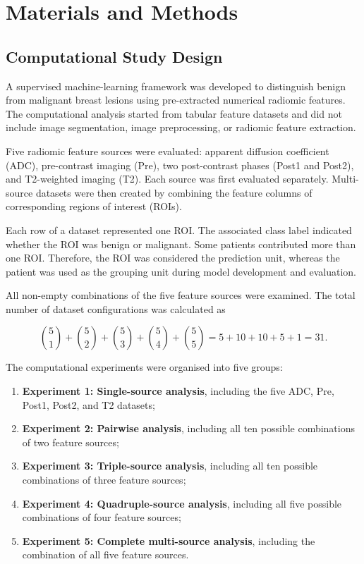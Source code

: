 \documentclass[12pt,twocolumn]{article}
\begin{document}
\section{Materials and Methods}
\label{sec:materials_methods}

\subsection{Computational Study Design}
\label{subsec:computational_design}

A supervised machine-learning framework was developed to distinguish
benign from malignant breast lesions using pre-extracted numerical
radiomic features. The computational analysis started from tabular
feature datasets and did not include image segmentation, image
preprocessing, or radiomic feature extraction.

Five radiomic feature sources were evaluated: apparent diffusion
coefficient (ADC), pre-contrast imaging (Pre), two post-contrast phases
(Post1 and Post2), and T2-weighted imaging (T2). Each source was first
evaluated separately. Multi-source datasets were then created by
combining the feature columns of corresponding regions of interest
(ROIs).

Each row of a dataset represented one ROI. The associated class label
indicated whether the ROI was benign or malignant. Some patients
contributed more than one ROI. Therefore, the ROI was considered the
prediction unit, whereas the patient was used as the grouping unit
during model development and evaluation.

All non-empty combinations of the five feature sources were examined.
The total number of dataset configurations was calculated as

\begin{equation}
\binom{5}{1}+\binom{5}{2}+\binom{5}{3}
+\binom{5}{4}+\binom{5}{5}
=5+10+10+5+1=31.
\label{eq:number_of_dataset_combinations}
\end{equation}

The computational experiments were organised into five groups:

\begin{enumerate}
    \item \textbf{Experiment 1: Single-source analysis}, including the
    five ADC, Pre, Post1, Post2, and T2 datasets;

    \item \textbf{Experiment 2: Pairwise analysis}, including all ten
    possible combinations of two feature sources;

    \item \textbf{Experiment 3: Triple-source analysis}, including all
    ten possible combinations of three feature sources;

    \item \textbf{Experiment 4: Quadruple-source analysis}, including
    all five possible combinations of four feature sources;

    \item \textbf{Experiment 5: Complete multi-source analysis},
    including the combination of all five feature sources.
\end{enumerate}
\end{document}
